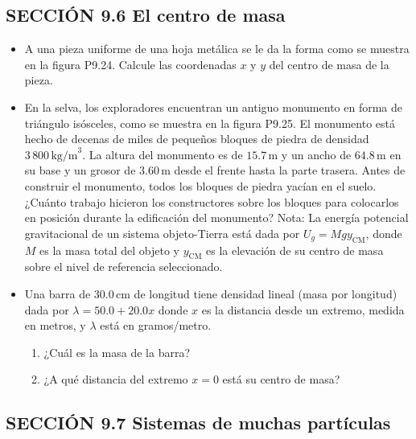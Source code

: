 \documentclass[11pt,a4paper]{article}
\begin{document}
\subsection*{SECCIÓN 9.6 El centro de masa}

\begin{itemize}
    \item[\textbf{24.}] A una pieza uniforme de una hoja metálica se le da la forma como se muestra en la figura P9.24. Calcule las coordenadas \(x\) y \(y\) del centro de masa de la pieza.
    \vspace*{6cm}

    \item[\textbf{25.}] En la selva, los exploradores encuentran un antiguo monumento en forma de triángulo isósceles, como se muestra en la figura P9.25. El monumento está hecho de decenas de miles de pequeños bloques de piedra de densidad \(3\,800\,\text{kg/m}^3\). La altura del monumento es de \(15.7\,\text{m}\) y un ancho de \(64.8\,\text{m}\) en su base y un grosor de \(3.60\,\text{m}\) desde el frente hasta la parte trasera. Antes de construir el monumento, todos los bloques de piedra yacían en el suelo. ¿Cuánto trabajo hicieron los constructores sobre los bloques para colocarlos en posición durante la edificación del monumento? Nota: La energía potencial gravitacional de un sistema objeto-Tierra está dada por \(U_g = Mgy_{\text{CM}}\), donde \(M\) es la masa total del objeto y \(y_{\text{CM}}\) es la elevación de su centro de masa sobre el nivel de referencia seleccionado.
    \vspace*{6cm}

    \item[\textbf{26.}] Una barra de \(30.0\,\text{cm}\) de longitud tiene densidad lineal (masa por longitud) dada por \(\lambda = 50.0 + 20.0x\) donde \(x\) es la distancia desde un extremo, medida en metros, y \(\lambda\) está en gramos/metro.
    \begin{enumerate}
        \item ¿Cuál es la masa de la barra?
        \item ¿A qué distancia del extremo \(x=0\) está su centro de masa?
    \end{enumerate}
    \vspace*{6cm}
\end{itemize}

\newpage

\subsection*{SECCIÓN 9.7 Sistemas de muchas partículas}
\end{document}
